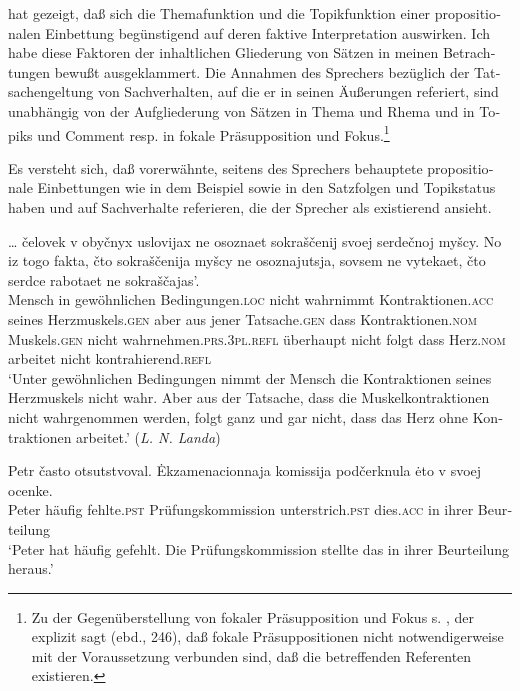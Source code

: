 \documentclass[output=paper]{langscibook}
\begin{document}
\begin{otherlanguage}{german}
\citet{kiefer1978factivity-in-hungarian, kiefer1978functional-sentence-perspective-and-presuppositions} hat gezeigt, daß sich die Themafunktion und die Topikfunktion einer propositionalen Einbettung begünstigend auf deren faktive Interpretation auswirken. Ich habe diese Faktoren der inhaltlichen Gliederung von Sätzen in meinen Betrachtungen bewußt ausgeklammert. Die Annahmen des Sprechers bezüglich der Tatsachengeltung von Sachverhalten, auf die er in seinen Äußerungen referiert, sind unabhängig von der Aufgliederung von Sätzen in Thema und Rhema und in Topiks und Comment resp. in fokale Präsupposition und Fokus.\footnote{Zu der Gegenüberstellung von fokaler Präsupposition und Fokus s. \citet[Kap. 6]{jackendoff1972semantic-interpretation-in-generative-grammar.}, der explizit sagt (ebd., 246), daß fokale Präsuppositionen nicht notwendigerweise mit der Vor\-aus\-se\-tzung verbunden sind, daß die betreffenden Referenten existieren.} 

Es versteht sich, daß vorerwähnte, seitens des Sprechers behauptete propositionale Einbettungen wie in dem Beispiel  sowie in den Satzfolgen  und  Topikstatus haben und auf Sachverhalte referieren, die der Sprecher als exis\-tie\-rend ansieht.

\ea \label{ex:zi83:58}
    \gll … čelovek v obyčnyx uslovijax ne osoznaet sokraščenij svoej {serdečnoj myšcy}. No iz togo fakta, čto sokraščenija myšcy ne osoznajutsja, sovsem ne vytekaet, čto serdce rabotaet ne sokraščajas’. \\
    {} Mensch in gewöhnlichen Bedingungen.\textsc{loc} nicht wahrnimmt Kontraktionen.\textsc{acc} seines Herzmuskels.\textsc{gen} aber aus jener Tatsache.\textsc{gen} dass Kontraktionen.\textsc{nom} Muskels.\textsc{gen} nicht wahrnehmen.\textsc{prs}.3\textsc{pl}.\textsc{refl} überhaupt nicht folgt dass Herz.\textsc{nom} arbeitet nicht kontrahierend.\textsc{refl} \\
    \glt ‘Unter gewöhnlichen Bedingungen nimmt der Mensch die Kontraktionen seines Herzmuskels nicht wahr. Aber aus der Tatsache, dass die Muskelkontraktionen nicht wahrgenommen werden, folgt ganz und gar nicht, dass das Herz ohne Kontraktionen arbeitet.’ (\textit{L. N. Landa})
\z

\ea \label{ex:zi83:59}
    \gll Petr často otsutstvoval. {Ėkzamenacionnaja komissija} podčerknula ėto v svoej ocenke. \\
    Peter häufig fehlte.\textsc{pst}  Prüfungskommission unterstrich.\textsc{pst} dies.\textsc{acc} in ihrer Beurteilung \\
    \glt ‘Peter hat häufig gefehlt. Die Prüfungskommission stellte das  in ihrer Beurteilung heraus.’
\z


\end{otherlanguage}
\end{document}

